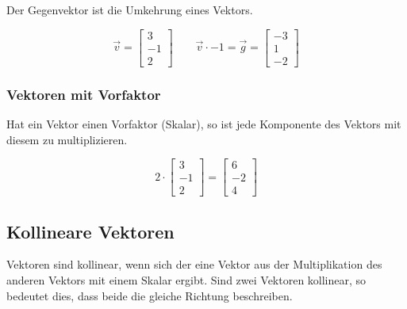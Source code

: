Der Gegenvektor ist die Umkehrung eines Vektors.

\begin{equation*}
    \vec{v} =
    \begin{bmatrix}
        3 \\
        -1 \\
        2
    \end{bmatrix}
    \qquad \vec{v} \cdot -1 = \vec{g} =
    \begin{bmatrix}
        -3 \\
        1 \\
        -2
    \end{bmatrix}
\end{equation*}

\subsubsection{Vektoren mit Vorfaktor}

Hat ein Vektor einen Vorfaktor (Skalar), so ist jede Komponente
des Vektors mit diesem zu multiplizieren.

\begin{equation*}
    2 \cdot
    \begin{bmatrix}
        3 \\
        -1 \\
        2
    \end{bmatrix}
    =
    \begin{bmatrix}
        6 \\
        -2 \\
        4
    \end{bmatrix}
\end{equation*}

\subsection{Kollineare Vektoren}

Vektoren sind kollinear, wenn sich der eine Vektor aus der Multiplikation
des anderen Vektors mit einem Skalar ergibt.
Sind zwei Vektoren kollinear, so bedeutet dies, dass beide die gleiche
Richtung beschreiben.

